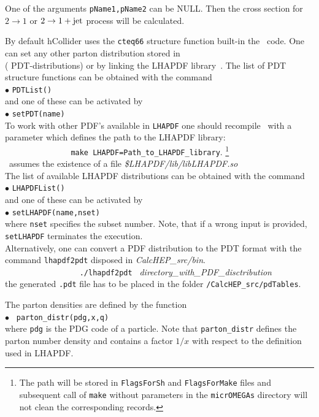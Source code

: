\documentclass[12pt,a4paper]{article}
\begin{document}
One of the arguments \verb|pName1,pName2| can be NULL. Then the cross section for $2\to1$   or $2\to1 + {\rm jet}$
process will be calculated. 

By default hCollider uses the 
\verb|cteq66| \cite{Nadolsky:2008zw}
structure function built-in
the \micro\ code. One can set any other parton distribution stored  in\\
   ( PDT-distributions) or by linking the  LHAPDF library~\cite{Buckley:2014ana}.  The list  of  PDT  structure functions  can be
obtained with the command \\
$\bullet$ \verb|PDTList()| \\
and one of these can be activated by\\ 
$\bullet$ \verb|setPDT(name)|\\

To work with other PDF's available in {\tt LHAPDF}  one should 
 recompile \micro\ with a parameter which defines the  path to the LHAPDF library:\\
\verb|               make LHAPDF=|{\tt Path\_to\_LHAPDF\_library}. \footnote{The path will be stored in {\tt FlagsForSh} and 
{\tt FlagsForMake} files and subsequent call of {\tt make} without parameters  in the {\tt micrOMEGAs} directory  will not clean the corresponding records.  } \\
\micro\ assumes the existence of a file {\it  \$LHAPDF/lib/libLHAPDF.so}\\
The list of available LHAPDF
distributions can be obtained with the command\\
$\bullet$ \verb|LHAPDFList()|\\
and one of these can be activated by \\
$\bullet$ \verb|setLHAPDF(name,nset)|\\
where {\tt nset} specifies the subset number. Note, that if a wrong input is provided, 
\verb|setLHAPDF| terminates the execution.\\[2mm]
%
Alternatively, one can convert a  PDF distribution to the PDT format with  the command {\tt  lhapdf2pdt} disposed in {\it CalcHEP\_src/bin}.\\
\verb|                 ./lhapdf2pdt | {\it directory\_with\_PDF\_disctribution} \\
the generated {\tt .pdt} file has to be placed in the folder {\tt /CalcHEP\_src/pdTables}.
  

The parton densities are  defined  by the function \\
$\bullet$ \verb| parton_distr(pdg,x,q)|\\
where {\tt pdg} is the PDG code of a particle. Note that \verb|parton_distr| defines the parton number density and  
contains a factor $1/x$  with respect to the  definition used in LHAPDF. 
\end{document}
